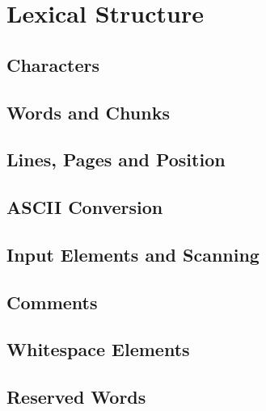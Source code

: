 %
%
%
%

\chapter{Lexical Structure}


\section{Characters}
\section{Words and Chunks}
\section{Lines, Pages and Position}
\section{ASCII Conversion}
\section{Input Elements and Scanning}
\section{Comments}
\section{Whitespace Elements}
\section{Reserved Words}
